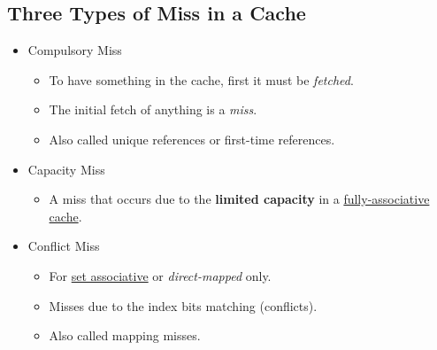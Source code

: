 \documentclass[10pt]{article}
\begin{document}
\subsection*{Three Types of Miss in a Cache}
\begin{itemize}
    \item Compulsory Miss
    \begin{itemize}
        \item To have something in the cache, first it must be \textit{fetched}.
        \item The initial fetch of anything is a \textit{miss}.
        \item Also called unique references or first-time references.
    \end{itemize}
    \item Capacity Miss
    \begin{itemize}
        \item A miss that occurs due to the \textbf{limited capacity} in a \underline{fully-associative cache}.
    \end{itemize}
    \item Conflict Miss
    \begin{itemize}
        \item For \underline{set associative} or \textit{direct-mapped} only.
        \item Misses due to the index bits matching (conflicts).
        \item Also called mapping misses.
    \end{itemize}
\end{itemize}
\end{document}
